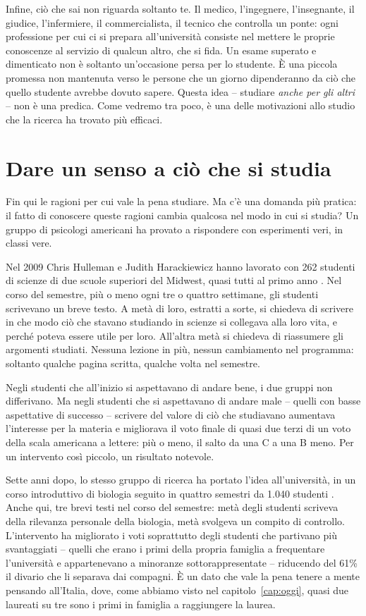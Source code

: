 Infine, ciò che sai non riguarda soltanto te. Il medico, l'ingegnere,
l'insegnante, il giudice, l'infermiere, il commercialista, il tecnico
che controlla un ponte: ogni professione per cui ci si prepara
all'università consiste nel mettere le proprie conoscenze al servizio di
qualcun altro, che si fida. Un esame superato e dimenticato non è
soltanto un'occasione persa per lo studente. È una piccola promessa non
mantenuta verso le persone che un giorno dipenderanno da ciò che quello
studente avrebbe dovuto sapere. Questa idea -- studiare \emph{anche per
gli altri} -- non è una predica. Come vedremo tra poco, è una delle
motivazioni allo studio che la ricerca ha trovato più efficaci.

\section{Dare un senso a ciò che si studia}

Fin qui le ragioni per cui vale la pena studiare. Ma c'è una domanda
più pratica: il fatto di conoscere queste ragioni cambia qualcosa nel
modo in cui si studia? Un gruppo di psicologi americani ha provato a
rispondere con esperimenti veri, in classi vere.

Nel 2009 Chris Hulleman e Judith Harackiewicz hanno lavorato con 262
studenti di scienze di due scuole superiori del Midwest, quasi tutti al
primo anno \parencite{hulleman2009}. Nel corso del semestre, più o meno
ogni tre o quattro settimane, gli studenti scrivevano un breve testo. A
metà di loro, estratti a sorte, si chiedeva di scrivere in che modo ciò
che stavano studiando in scienze si collegava alla loro vita, e perché
poteva essere utile per loro. All'altra metà si chiedeva di riassumere
gli argomenti studiati. Nessuna lezione in più, nessun cambiamento nel
programma: soltanto qualche pagina scritta, qualche volta nel semestre.

Negli studenti che all'inizio si aspettavano di andare bene, i due
gruppi non differivano. Ma negli studenti che si aspettavano di andare
male -- quelli con basse aspettative di successo -- scrivere del valore
di ciò che studiavano aumentava l'interesse per la materia e migliorava
il voto finale di quasi due terzi di un voto della scala americana a
lettere: più o meno, il salto da una C a una B meno. Per un intervento
così piccolo, un risultato notevole.

Sette anni dopo, lo stesso gruppo di ricerca ha portato l'idea
all'università, in un corso introduttivo di biologia seguito in quattro
semestri da 1.040 studenti \parencite{harackiewicz2016}. Anche qui, tre
brevi testi nel corso del semestre: metà degli studenti scriveva della
rilevanza personale della biologia, metà svolgeva un compito di
controllo. L'intervento ha migliorato i voti soprattutto degli studenti
che partivano più svantaggiati -- quelli che erano i primi della propria
famiglia a frequentare l'università e appartenevano a minoranze
sottorappresentate -- riducendo del 61\% il divario che li separava dai
compagni. È un dato che vale la pena tenere a mente pensando all'Italia,
dove, come abbiamo visto nel capitolo~\ref{cap:oggi}, quasi due laureati
su tre sono i primi in famiglia a raggiungere la laurea.

